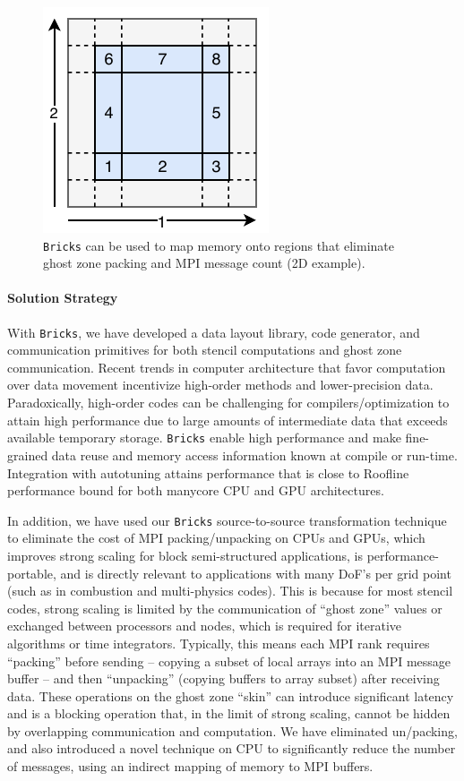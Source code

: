 \begin{figure}
\begin{center}
  \includegraphics[trim=3mm 5mm 3mm 8mm,width=.33\textwidth]{projects/2.3.2-Tools/2.3.2.10-PROTEAS-YTUNE/Bricks-mpi-parts.pdf}
\end{center}
  \caption{\texttt{Bricks} can be used to map memory onto regions that
  eliminate ghost zone packing and MPI message count (2D example).}
\end{figure}

\paragraph{Solution Strategy}
With \texttt{Bricks}, we have developed a data layout library, code 
  generator, and communication primitives for both stencil computations and ghost zone communication.
Recent trends in computer architecture that favor computation over data 
  movement incentivize high-order methods and lower-precision data.
Paradoxically, high-order codes can be challenging for compilers/optimization 
  to attain high performance due to large amounts of intermediate data that exceeds available temporary storage.
\texttt{Bricks} enable high performance and make fine-grained data reuse and 
  memory access information known at compile or run-time.
Integration with autotuning attains performance that is close to Roofline
  performance bound for both manycore CPU and GPU architectures.

In addition, we have used our \texttt{Bricks} source-to-source transformation technique to 
  eliminate the cost of MPI packing/unpacking on CPUs and GPUs, which 
  improves strong scaling for block semi-structured applications, is 
  performance-portable, and is directly relevant to applications with many 
  DoF’s per grid point (such as in combustion and multi-physics codes). 
This is because for most stencil codes, strong scaling is
  limited by the communication of ``ghost zone'' values or exchanged between
  processors and nodes, which is required for iterative algorithms or time
  integrators. 
Typically, this means each MPI rank requires ``packing'' before sending – copying a 
  subset of local arrays into an MPI message buffer – and then ``unpacking'' 
  (copying buffers to array subset) after receiving data. 
These operations on the ghost zone ``skin'' can introduce significant latency 
  and is a blocking operation that, in the limit of strong scaling, 
  cannot be hidden by overlapping communication and computation. 
We have eliminated un/packing, and also introduced a novel technique on CPU to
  significantly reduce the number of messages, using an indirect mapping 
  of memory to MPI buffers. 


